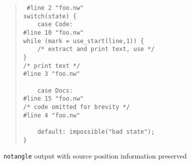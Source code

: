 \semifilbreak

\begin{quote}\tt\obeyspaces
\#line\ 2\ "foo.nw"\\
switch(state)\ \{\\
\mbox{ }\ \ \ case\ Code:\ \\
\#line\ 10\ "foo.nw"\\
while\ (mark\ =\ use\_start(line,1))\ \{\ \\
\mbox{ }\ \ \ /*\ extract\ and\ print\ text,\ use\ */\\
\}\\
/*\ print\ text\ */\\
\#line\ 3\ "foo.nw"\\
\mbox{ }\ \ \ \ \ \ \ \ \ \ \ \ \ \ \ \ \ \ \ \ \\
\mbox{ }\ \ \ case\ Docs:\ \\
\#line\ 15\ "foo.nw"\\
/*\ code\ omitted\ for\ brevity\ */\\
\#line\ 4\ "foo.nw"\\
\mbox{ }\ \ \ \ \ \ \ \ \ \ \ \ \ \ \ \ \ \ \ \ \ \ \\
\mbox{ }\ \ \ default:\ impossible("bad\ state");\\
\}
\end{quote} 
\caption{{\tt notangle} output with source position information preserved}



